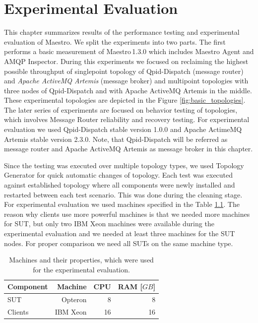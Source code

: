 
\chapter{Experimental Evaluation}
\label{Experimental Evaluation}
This chapter summarizes results of the performance testing and experimental evaluation of Maestro. We split the experiments into two parts. The first performs a basic measurement of Maestro\,1.3.0 which includes Maestro Agent and AMQP Inspector. During this experiments we focused on reclaiming the highest possible throughput of singlepoint topology of Qpid-Dispatch (message router) and \emph{Apache ActiveMQ Artemis} (message broker) and multipoint topologies with three nodes of Qpid-Dispatch and with Apache ActiveMQ Artemis in the middle. These experimental topologies are depicted in the Figure \ref{fig:basic_topologies}. The later series of experiments are focused on behavior testing of topologies, which involves Message Router reliability and recovery testing. For experimental evaluation we used Qpid-Dispatch stable version 1.0.0 and Apache ActimeMQ Artemis stable version 2.3.0. Note, that Qpid-Dispatch will be referred as message router and Apache ActiveMQ Artemis as message broker in this chapter.

Since the testing was executed over multiple topology types, we used Topology Generator for quick automatic changes of topology. Each test was executed against established topology where all components were newly installed and restarted between each test scenario. This was done during the cleaning stage. For experimental evaluation we used machines specified in the Table \ref{tab:machines}. The reason why clients use more powerful machines is that we needed more machines for SUT, but only two IBM Xeon machines were available during the experimental evaluation and we needed at least three machines for the SUT nodes. For proper comparison we need all SUTs on the same machine type.

\begingroup
\setlength{\tabcolsep}{10pt} %
\renewcommand{\arraystretch}{1.35} %
	\begin{table}[H]
	\centering
	\begin{tabular}{|l|r|r|r|}
	\hline
	\rowcolor[HTML]{C5E3DF}
	\textbf{Component} & \textbf{Machine} & \textbf{CPU} & \textbf{RAM [$GB$]} \\ \hline
	SUT & Opteron & 8 & 8 \\ \hline
	Clients & IBM Xeon & 16 & 16 \\ \hline
	\end{tabular}
	\caption{Machines and their properties, which were used for the experimental evaluation.}
	\label{tab:machines}
	\end{table}
\endgroup

